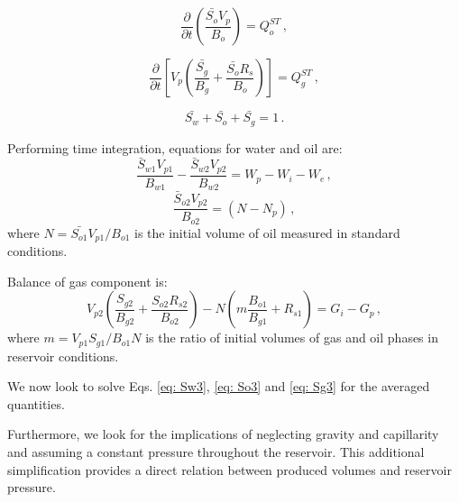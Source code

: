 \documentclass[authoryear,preprint,review,12pt]{elsarticle}
\begin{document}
\begin{equation}\label{eq: So4}
\frac{\partial}{\partial t} \left(\frac{\bar{S_o} V_p}{B_o} \right) = Q_o^{ST} \, ,
\end{equation}

\begin{equation}\label{eq: Sg4}
\frac{\partial}{\partial t} \left[ V_p \left(\frac{\bar{S_g}}{B_g} + \frac{\bar{S_o} R_s}{B_o} \right) \right] = Q_g^{ST} \, ,
\end{equation}

\begin{equation}\label{eq: S14}
\bar{S_w}+\bar{S_o}+\bar{S_g}=1 \, .
\end{equation}

Performing time integration, equations for water and oil are:
\begin{equation}\label{eq: So5}
\frac{\bar{S}_{w1} V_{p1}}{B_{w1}} - \frac{\bar{S}_{w2} V_{p2}}{B_{w2}} = W_p - W_i - W_e\, ,
\end{equation}
\begin{equation}\label{eq: So5}
\frac{\bar{S}_{o2} V_{p2}}{B_{o2}} = \left(N-N_p\right) \, ,
\end{equation}
where $N=\bar{S_{o1}} V_{p1} / B_{o1}$ is the initial volume of oil measured in standard conditions.

Balance of gas component is:
\begin{equation}\label{eq: Sg5}
V_{p2}\left(\frac{S_{g2}}{B_{g2}} +\frac{S_{o2} R_{s2}}{B_{o2}}\right) - N\left(m\frac{B_{o1}}{B_{g1}} + R_{s1}\right)=G_i-G_p \, ,
\end{equation}
where $m=V_{p1} S_{g1}/ B_{o1} N$ is the ratio of initial volumes of gas and oil phases in reservoir conditions.


We now look to solve Eqs. \eqref{eq: Sw3}, \eqref{eq: So3} and \eqref{eq: Sg3} for the averaged quantities. 

Furthermore, we look for the implications of neglecting gravity and capillarity and assuming a constant pressure throughout the reservoir. This additional simplification provides a direct relation between produced volumes and reservoir pressure.
\end{document}
